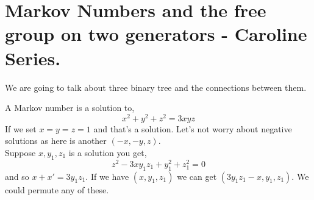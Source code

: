 \documentclass{article}
\begin{document}
  \maketitle

\section{Markov Numbers and the free group on two generators - Caroline Series.}

We are going to talk about three binary tree and the connections between them.

A Markov number is a solution to,
$$ x^2 + y^2 + z^2 = 3xyz $$
If we set $x=y=z=1$ and that's a solution. Let's not worry about negative solutions as here is another $(-x, -y, z)$. \\

Suppose $x, y_1, z_1$ is a solution you get,
$$ z^2 - 3xy_1z_1 + y_1^2 + z_1^2 = 0 $$
and so $x + x' = 3y_1z_1$. If we have $(x, y_1, z_1)$ we can get $(3y_1z_1 - x, y_1, z_1)$. We could permute any of these. \\
\end{document}
